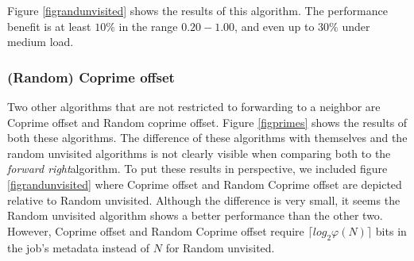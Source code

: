 \documentclass[10pt,a4paper]{article}
\newcommand{\FR}{\textit{forward right\xspace}}
\begin{document}
Figure \ref{figrandunvisited} shows the results of this algorithm. The performance benefit is at least $10 \%$ in the range $0.20 - 1.00$, and even up to $30 \%$ under medium load.

\subsubsection*{(Random) Coprime offset}
Two other algorithms that are not restricted to forwarding to a neighbor are Coprime offset and Random coprime offset. Figure \ref{figprimes} shows the results of both these algorithms. The difference of these algorithms with themselves and the random unvisited algorithms is not clearly visible when comparing both to the \FR algorithm. To put these results in perspective, we included figure \ref{figrandunvisited} where Coprime offset and Random Coprime offset are depicted relative to Random unvisited. Although the difference is very small, it seems the Random unvisited algorithm shows a better performance than the other two. However, Coprime offset and Random Coprime offset require $\lceil log_2 \varphi(N) \rceil$ bits in the job's metadata instead of $N$ for Random unvisited.
\end{document}
